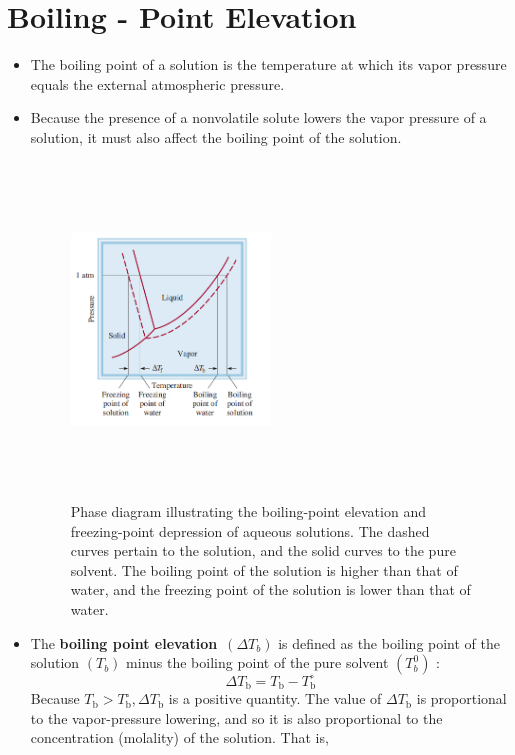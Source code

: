 \documentclass[a4paper,12pt,twocolumn]{article}
\begin{document}
\section{Boiling - Point Elevation}
\begin{itemize}
\item The boiling point of a solution is the temperature at which its vapor pressure equals the external atmospheric pressure.
\item Because the presence of a nonvolatile solute lowers the vapor pressure of a solution, it must also affect the boiling point of the solution. 


\begin{figure}[h]
\begin{center}
\includegraphics[width=0.5\textwidth, height=3.5in]{Screenshot 2023-03-23 161120.png}
\end{center}
\caption{Phase diagram illustrating the boiling-point elevation and freezing-point depression of aqueous solutions. The dashed curves pertain to the solution, and the solid curves to the pure solvent. The boiling point of the solution is higher than that of water, and the freezing point of the solution is lower than that of water.}
\end{figure}
\item The \textbf{boiling point elevation}\ $\left(\Delta T_b\right)$ is defined as the boiling point of the solution $\left(T_b\right)$ minus the boiling point of the pure solvent $\left(T_b^0\right)$ :
$$
\Delta T_{\mathrm{b}}=T_{\mathrm{b}}-T_{\mathrm{b}}^{\circ}
$$
Because $T_{\mathrm{b}}>T_{\mathrm{b}}^{\circ}, \Delta T_{\mathrm{b}}$ is a positive quantity.
The value of $\Delta T_{\mathrm{b}}$ is proportional to the vapor-pressure lowering, and so it is also proportional to the concentration (molality) of the solution. That is,

\end{itemize}
\end{document}
